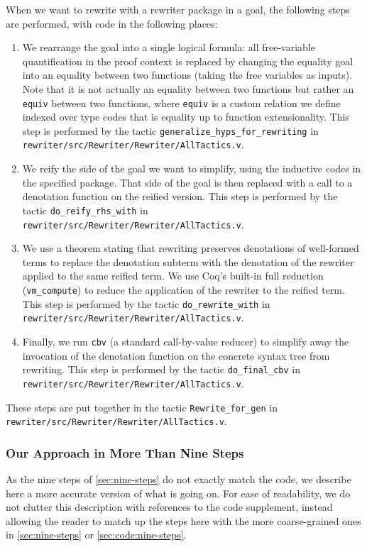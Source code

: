 \documentclass[sigplan,10pt,review,anonymous]{acmart}\settopmatter{printfolios=true,printccs=false,printacmref=false}
\begin{document}
When we want to rewrite with a rewriter package in a goal, the following steps are performed, with code in the following places:
\begin{enumerate}
  \item
    We rearrange the goal into a single logical formula: all free-variable quantification in the proof context is replaced by changing the equality goal into an equality between two functions (taking the free variables as inputs).
    Note that it is not actually an equality between two functions but rather an \texttt{equiv} between two functions, where \texttt{equiv} is a custom relation we define indexed over type codes that is equality up to function extensionality.
    This step is performed by the tactic \texttt{generalize\_hyps\_for\_rewriting} in \texttt{rewriter/src/Rewriter/Rewriter/AllTactics.v}.
  \item
    We reify the side of the goal we want to simplify, using the inductive codes in the specified package.  That side of the goal is then replaced with a call to a denotation function on the reified version.
    This step is performed by the tactic \texttt{do\_reify\_rhs\_with} in \texttt{rewriter/src/Rewriter/Rewriter/AllTactics.v}.
  \item
    We use a theorem stating that rewriting preserves denotations of well-formed terms to replace the denotation subterm with the denotation of the rewriter applied to the same reified term.
    We use Coq's built-in full reduction (\texttt{vm\_compute}) to reduce the application of the rewriter to the reified term.
    This step is performed by the tactic \texttt{do\_rewrite\_with} in \texttt{rewriter/src/Rewriter/Rewriter/AllTactics.v}.
  \item
    Finally, we run \texttt{cbv} (a standard call-by-value reducer) to simplify away the invocation of the denotation function on the concrete syntax tree from rewriting.
    This step is performed by the tactic \texttt{do\_final\_cbv} in \texttt{rewriter/src/Rewriter/Rewriter/AllTactics.v}.
\end{enumerate}
These steps are put together in the tactic \texttt{Rewrite\_for\_gen} in \texttt{rewriter/src/Rewriter/Rewriter/AllTactics.v}.

\subsubsection{Our Approach in More Than Nine Steps}

As the nine steps of \autoref{sec:nine-steps} do not exactly match the code, we describe here a more accurate version of what is going on.
For ease of readability, we do not clutter this description with references to the code supplement, instead allowing the reader to match up the steps here with the more coarse-grained ones in \autoref{sec:nine-steps} or \autoref{sec:code:nine-steps}.
\end{document}

